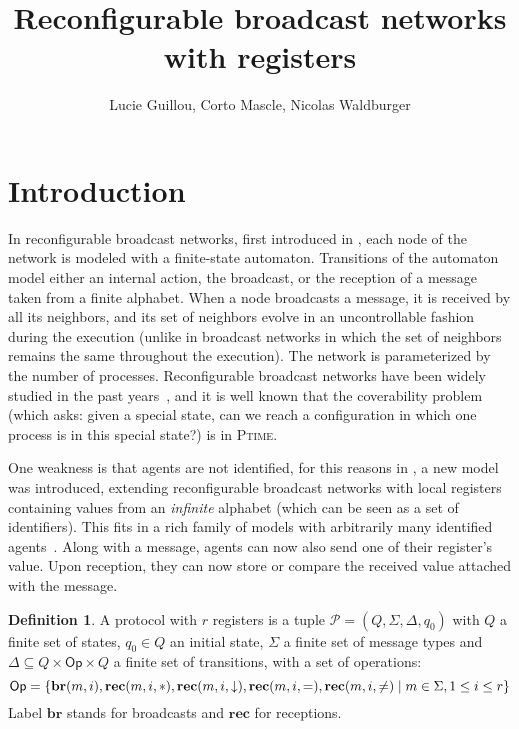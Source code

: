 \documentclass{article}
\title{Reconfigurable broadcast networks with registers}
\author{Lucie Guillou, Corto Mascle, Nicolas Waldburger}
\date{}
\newcommand{\set}[1]{\{#1\}}
\theoremstyle{definition}
\newtheorem{definition}[theorem]{Definition}
\begin{document}
	
	\maketitle
	
	\section{Introduction} 
	
	In reconfigurable broadcast networks, first introduced in \cite{DelzannoSZ2010Adhoc}, each node of the network is modeled with a finite-state automaton. Transitions of the automaton model either an internal action, the broadcast, or the reception of a message taken from a finite alphabet. When a node broadcasts a message, it is received by all its neighbors, and its set of neighbors evolve in an uncontrollable fashion during the execution (unlike in broadcast networks \cite{BZ83} in which the set of neighbors remains the same throughout the execution). The network is parameterized by the number of processes. Reconfigurable broadcast networks have been widely studied in the past years~\cite{DelzannoSTZ12, Balasubramanian18, BalasubramanianGW22}, and it is well known that the coverability problem (which asks: given a special state, can we reach a configuration in which one process is in this special state?) is in \textsc{Ptime}.
	
	One weakness is that agents are not identified, for this reasons in \cite{DelzannoST13}, a new model was introduced, extending reconfigurable broadcast networks with local registers containing values from an \emph{infinite} alphabet (which can be seen as a set of identifiers). This fits in a rich family of models with arbitrarily many identified agents~\cite{AbdullaAKR14,Aiswarya2015model}. Along with a message, agents can now also send one of their register's value. Upon reception, they can now store or compare the received value attached with the message.
	
	
	\begin{definition}
		A protocol with $r$ registers is a tuple $\mathcal{P} = (Q, \Sigma, \Delta, q_0)$  with $Q$ a finite set of states, $q_0 \in Q$ an initial state, $\Sigma$ a finite set of message types  and $\Delta \subseteq Q \times \mathsf{Op} \times Q$ a finite set of transitions, with a set of operations:\vspace{-0.3cm} \[\mathsf{Op} = \set{\mathbf{br}(m,i), \mathbf{rec}(m,i, \ast), \mathbf{rec}(m,i, \downarrow), \mathbf{rec}(m,i, =),\mathbf{rec}(m,i, \neq) \mid m \in \Sigma, 1 \leq i \leq r}\vspace{-0.3cm}\]
		Label $\mathbf{br}$ stands for broadcasts and $\mathbf{rec}$ for receptions.
		
	\end{definition}
	
\end{document}
